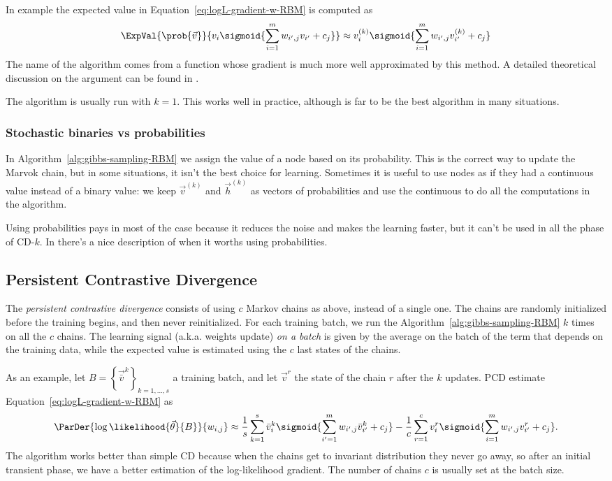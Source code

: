   In example the expected value in Equation~\eqref{eq:logL-gradient-w-RBM} is computed as
  \[
    \ExpVal{\prob{\vec{v}}}{v_i \sigmoid{\sum_{i=1}^m w_{i',j}v_{i'}+c_j}} \approx
      v^{(k)}_i \sigmoid{\sum_{i=1}^m w_{i',j}v^{(k)}_{i'}+c_j}
  \]
  The name of the algorithm comes from a function whose gradient is much more well approximated
  by this method. A detailed theoretical discussion on the argument can be found in
  \cite{fischer2012introduction}.
  
  The algorithm is usually run with \(k=1\). This works well in practice, although is far to be
  the best algorithm in many situations.
  
  \subsubsection*{Stochastic binaries vs probabilities}
  In Algorithm~\ref{alg:gibbs-sampling-RBM} we assign the value of a node based on its probability.
  This is the correct way to update the Marvok chain,  but in some situations, it isn't the best
  choice for learning. Sometimes it is useful to use nodes as if they had a continuous value
  instead of a binary value: we keep \(\vec{v}^{(k)}\) and \(\vec{h}^{(k)}\) as vectors of
  probabilities and use the continuous to do all the computations in the algorithm.
  
  Using probabilities pays in most of the case because it reduces the noise and makes the learning
  faster, but it can't be used in all the phase of CD-\(k\). In \cite{hinton2012practical} there's
  a nice description of when it worths using probabilities.
  
  
  \subsection{Persistent Contrastive Divergence}
  The \emph{persistent contrastive divergence} consists of using \(c\) Markov chains as above,
  instead of a single one. The chains are randomly initialized before the training begins,
  and then never reinitialized. For each training batch, we run the Algorithm~\ref{alg:gibbs-sampling-RBM}
  \(k\) times on all the \(c\) chains. The learning signal (a.k.a. weights update) \emph{on a batch}
  is given by the average on the batch of the term that depends on the training data,
  while the expected value is estimated using the \(c\) last states of the chains.
  
  As an example, let \(B = \left\{\vec{\bar{v}}^k\right\}_{k = 1, \dots, s}\) a training batch, and let
  \(\vec{v}^r\) the state of the chain \(r\) after the \(k\) updates. 
  PCD estimate  Equation~\eqref{eq:logL-gradient-w-RBM} as
  \[
    \ParDer{\log\likelihood{\vec{\theta}}{B}}{w_{i,j}} \approx
      \frac{1}{s}\sum_{k=1}^s{\bar{v}^k_i} \sigmoid{\sum_{i'=1}^m w_{i',j}{\bar{v}^k_{i'}}+c_j}
      -\frac{1}{c}\sum_{r=1}^c v^r_i \sigmoid{\sum_{i=1}^m w_{i',j}v^r_{i'}+c_j}.
  \]
  The algorithm works better than simple CD because when the chains get to invariant distribution
  they never go away, so after an initial transient phase, we have a better estimation of
  the log-likelihood gradient. The number of chains \(c\) is usually set at the batch size.
  
